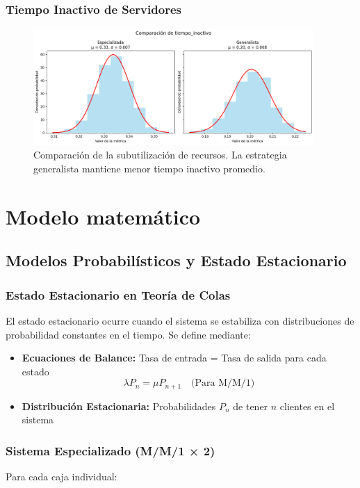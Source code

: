 \documentclass[letterpaper, 12pt]{report}
\begin{document}
\subsection{Tiempo Inactivo de Servidores}
\begin{figure}[H]
    \centering
    \includegraphics[width=0.95\textwidth]{images/ocio.png}
    \caption{Comparación de la subutilización de recursos. La estrategia generalista mantiene menor tiempo inactivo promedio.}
    \label{fig:inactividad}
\end{figure}



\chapter{Modelo matemático}

\section{Modelos Probabilísticos y Estado Estacionario}

\subsection{Estado Estacionario en Teoría de Colas}
El estado estacionario ocurre cuando el sistema se estabiliza con distribuciones de probabilidad constantes en el tiempo. Se define mediante:

\begin{itemize}
\item \textbf{Ecuaciones de Balance:} Tasa de entrada = Tasa de salida para cada estado
\[
\lambda P_n = \mu P_{n+1} \quad \text{(Para M/M/1)}
\]
\item \textbf{Distribución Estacionaria:} Probabilidades $P_n$ de tener $n$ clientes en el sistema
\end{itemize}

\subsection{Sistema Especializado (M/M/1 × 2)}
Para cada caja individual:
\end{document}
